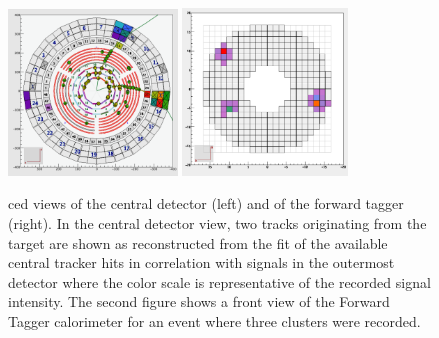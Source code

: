 \begin{figure}
\centering
\includegraphics[width=0.4\textwidth]{pics/ced_central.png}
\includegraphics[width=0.39\textwidth]{pics/ced_ft.png}
\caption{ced views of the central detector (left) and of the forward tagger (right). In the central detector view, two tracks originating from the target are shown as reconstructed from the fit of the available central tracker hits in correlation with signals in the outermost detector where the color scale is representative of the recorded signal intensity. The second figure shows a front view of the Forward Tagger calorimeter for an event where three clusters were recorded.
}
\label{fig:ced}
\end{figure}

